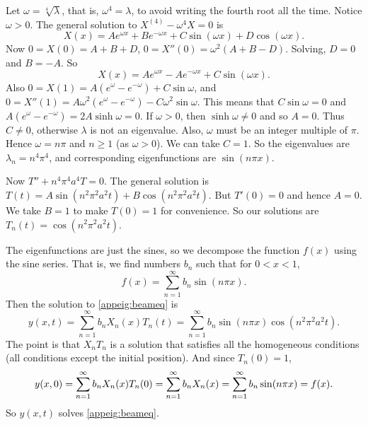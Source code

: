 Let $\omega = \sqrt[4]{\lambda}$, that is, $\omega^4 = \lambda$,
to avoid writing the fourth root
all the time.  Notice $\omega > 0$.
The general solution to
$X^{(4)} - \omega^4 X = 0$ is
\begin{equation*}
X(x) = A e^{\omega x} + B e^{-\omega x} + C \sin (\omega x) +
D \cos (\omega x) .
\end{equation*}
Now $0 = X(0) = A+B+D$, $0 = X''(0) = \omega^2 (A + B - D)$.
Solving,
$D = 0$ and $B = -A$.
So
\begin{equation*}
X(x) = A e^{\omega x} - A e^{-\omega x} + C \sin (\omega x) .
\end{equation*}
Also $0 = X(1) = A (e^{\omega} - e^{-\omega}) + C \sin \omega$, and
$0 = X''(1) = A \omega^2 (e^{\omega} - e^{-\omega}) - C \omega^2 \sin \omega$.
This means that $C \sin \omega  = 0$ and 
$A (e^{\omega} - e^{-\omega}) = 2 A \sinh \omega = 0$.  If $\omega > 0$, then
$\sinh \omega \neq 0$ and so $A = 0$.  Thus $C \neq 0$, otherwise
$\lambda$ is not an
eigenvalue.  Also, $\omega$ must be an integer multiple of
$\pi$.  Hence $\omega = n \pi$ and $n \geq 1$ (as $\omega > 0$).  We can take
$C=1$.  So the eigenvalues are $\lambda_n = n^4 \pi^4$, and corresponding eigenfunctions
are $\sin (n \pi x)$.

Now 
$T'' + n^4 \pi^4 a^4 T = 0$.  The general solution is $T(t) =
A \sin (n^2 \pi^2 a^2 t) + B \cos (n^2 \pi^2 a^2 t)$.  But $T'(0) = 0$ and hence
$A=0$.  We take $B=1$ to make $T(0) = 1$ for convenience.
So our solutions are $T_n(t) = \cos (n^2 \pi^2 a^2 t)$.

The eigenfunctions are just the sines, so we decompose the function $f(x)$
using the sine series.  That is,
we find numbers $b_n$ such that for
$0 < x < 1$,
\begin{equation*}
f(x) = \sum_{n=1}^\infty b_n \sin (n \pi x) .
\end{equation*}
Then the solution to \eqref{appeig:beameq} is
\begin{equation*}
y(x,t) = \sum_{n=1}^\infty b_n
X_n(x) T_n(t)
= \sum_{n=1}^\infty b_n
\sin (n \pi x)  \cos ( n^2 \pi^2 a^2 t ) .
\end{equation*}
The point is that $X_nT_n$ is a solution that satisfies all the homogeneous
conditions (all conditions except the initial position).  And since
$T_n(0) = 1$,
\begin{equation*}
y(x,0) = \sum_{n=1}^\infty b_n X_n(x) T_n(0) = 
\sum_{n=1}^\infty b_n X_n(x) =
\sum_{n=1}^\infty b_n
\sin (n \pi x) = f(x) .
\avoidbreak
\end{equation*}
So $y(x,t)$ solves \eqref{appeig:beameq}.

